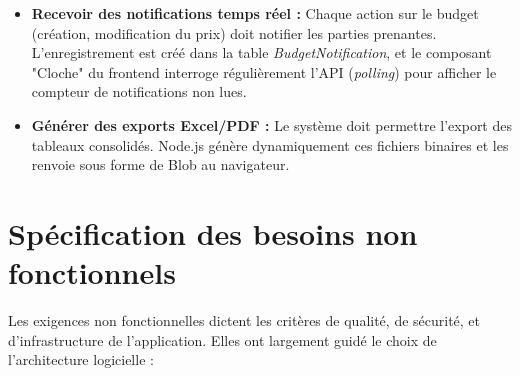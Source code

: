 \begin{itemize}
    \item \textbf{Recevoir des notifications temps réel :} Chaque action sur le budget (création, modification du prix) doit notifier les parties prenantes. L'enregistrement est créé dans la table \textit{BudgetNotification}, et le composant "Cloche" du frontend interroge régulièrement l'API (\textit{polling}) pour afficher le compteur de notifications non lues.
    
    \item \textbf{Générer des exports Excel/PDF :} Le système doit permettre l'export des tableaux consolidés. Node.js génère dynamiquement ces fichiers binaires et les renvoie sous forme de Blob au navigateur.
\end{itemize}

\section{Spécification des besoins non fonctionnels}
Les exigences non fonctionnelles dictent les critères de qualité, de sécurité, et d'infrastructure de l'application. Elles ont largement guidé le choix de l'architecture logicielle :

